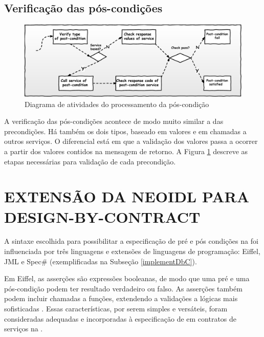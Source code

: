 \subsection{Verificação das pós-condições}
\vspace{-6mm}

\begin{figure}[!htb]
\centering
\includegraphics[width=140mm,trim = 0mm 0mm 0mm
0mm,clip]{img/FluxoPostcondicoes.pdf}
\vspace{-6mm}
\caption{Diagrama de atividades do processamento da pós-condição}
\label{FigServicePostcondition}
\end{figure}

A verificação das pós-condições acontece de modo muito similar a das
precondições. Há também os dois tipos, baseado em valores e em chamadas a
outros serviços. O diferencial está em que a validação dos valores passa a
ocorrer a partir dos valores contidos na mensagem de retorno. A Figura
\ref{FigServicePostcondition} descreve as etapas necessárias para validação de
cada precondição.


\section{EXTENSÃO DA NEOIDL PARA DESIGN-BY-CONTRACT}
\label{extensaoNeoIDL-DbC}

A sintaxe escolhida para possibilitar a especificação de pré e pós condições
na \neoidl{} foi influenciada por três linguagens e extensões de linguagens de
programação: Eiffel, JML e Spec\# (exemplificadas na Subseção
\ref{implementDbC}). 

Em Eiffel, as asserções são expressões booleanas, de modo que uma pré e uma
pós-condição podem ter resultado verdadeiro ou falso. As asserções também podem
incluir chamadas a funções, extendendo a validações a lógicas mais sofisticadas
\cite{meyer1992applying}. Essas ca\-rac\-te\-rís\-ti\-cas, por serem simples e
versáteis, foram consideradas adequadas e incorporadas à especificação de
\designbycontract{} em contratos de serviços na \neoidl{}.

